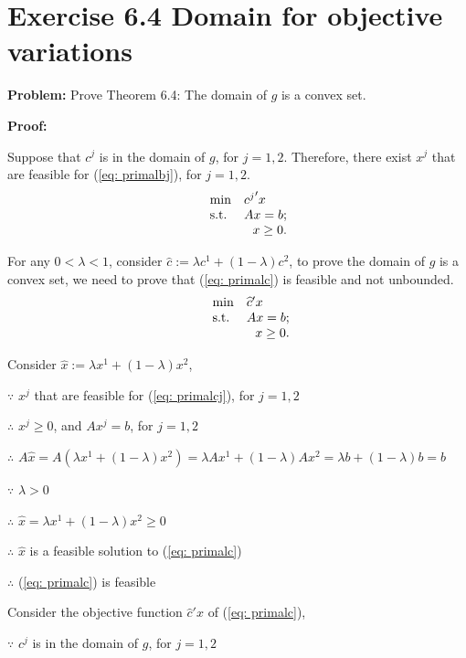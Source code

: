 \section{Exercise 6.4 Domain for objective variations}
\textbf{Problem:} Prove Theorem 6.4: The domain of $g$ is a convex set.

\textbf{Proof:} 

Suppose that $c^j$ is in the domain of $g$, for $j=1,2$. Therefore, there exist $x^j$ that are feasible for (\ref{eq: primalbj}), for $j=1,2$.
\begin{equation}
\label{eq: primalcj}
  \begin{array}{lrcll}
    \min
    & \multicolumn{4}{l}{{c^j}'x} \\
    \text{s.t.}
    & Ax=b;\\
    & x\geq0.
  \end{array}
\end{equation}

For any $0<\lambda<1$, consider $\widehat{c}:=\lambda{}c^1+(1-\lambda)c^2$, to prove the domain of $g$ is a convex set, we need to prove that (\ref{eq: primalc}) is feasible and not unbounded.  
\begin{equation}
\label{eq: primalc}
  \begin{array}{lrcll}
    \min
    & \multicolumn{4}{l}{\widehat{c}'x} \\
    \text{s.t.}
    & Ax=b;\\
    & x\geq0.
  \end{array}
\end{equation}

Consider $\widehat{x}:=\lambda{}x^1+(1-\lambda)x^2$, 

$\because$ $x^j$ that are feasible for (\ref{eq: primalcj}), for $j=1,2$

$\therefore$ $x^j\geq0$, and $Ax^j=b$, for $j=1,2$

$\therefore$ $A\widehat{x}=A(\lambda{}x^1+(1-\lambda)x^2)=\lambda{}Ax^1+(1-\lambda)Ax^2
=\lambda{}b+(1-\lambda)b=b$

$\because$ $\lambda>0$

$\therefore$ $\widehat{x}=\lambda{}x^1+(1-\lambda)x^2\geq0$

$\therefore$ $\widehat{x}$ is a feasible solution to (\ref{eq: primalc})

$\therefore$ (\ref{eq: primalc}) is feasible

Consider the objective function $\widehat{c}'x$ of (\ref{eq: primalc}),

$\because$ $c^j$ is in the domain of $g$, for $j=1,2$

